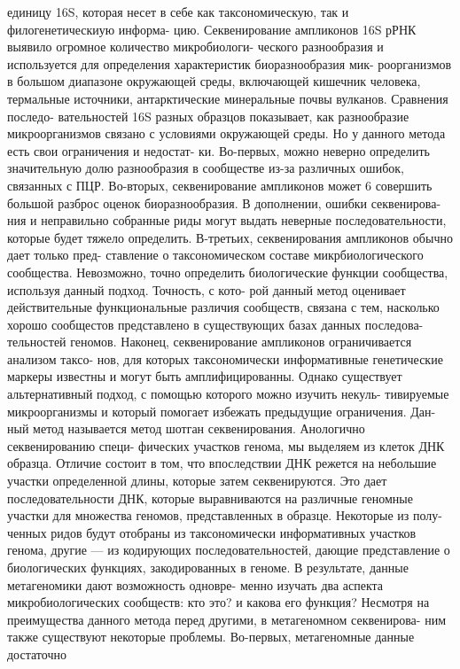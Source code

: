 единицу 16S, которая несет в себе как таксономическую, так и филогенетическиую информа-
цию. Секвенирование ампликонов 16S рРНК выявило огромное количество микробиологи-
ческого разнообразия и используется для определения характеристик биоразнообразия мик-
роорганизмов в большом диапазоне окружающей среды, включающей кишечник человека,
термальные источники, антарктические минеральные почвы вулканов. Сравнения последо-
вательностей 16S разных образцов показывает, как разнообразие микроорганизмов связано
с условиями окружающей среды. Но у данного метода есть свои ограничения и недостат-
ки. Во-первых, можно неверно определить значительную долю разнообразия в сообществе
из-за различных ошибок, связанных с ПЦР. Во-вторых, секвенирование ампликонов может
6
совершить большой разброс оценок биоразнообразия. В дополнении, ошибки секвенирова-
ния и неправильно собранные риды могут выдать неверные последовательности, которые
будет тяжело определить. В-третьих, секвенирования ампликонов обычно дает только пред-
ставление о таксономическом составе микрбиологического сообщества. Невозможно, точно
определить биологические функции сообщества, используя данный подход. Точность, с кото-
рой данный метод оценивает действительные функциональные различия сообществ, связана
с тем, насколько хорошо сообщестов представлено в существующих базах данных последова-
тельностей геномов. Наконец, секвенирование ампликонов ограничивается анализом таксо-
нов, для которых таксономически информативные генетические маркеры известны и могут
быть амплифицированны.
Однако существует альтернативный подход, с помощью которого можно изучить некуль-
тивируемые микроорганизмы и который помогает избежать предыдущие ограничения. Дан-
ный метод называется метод шотган секвенирования. Анологично секвенированию специ-
фических участков генома, мы выделяем из клеток ДНК образца. Отличие состоит в том,
что впоследствии ДНК режется на небольшие участки определенной длины, которые затем
секвенируются. Это дает последовательности ДНК, которые выравниваются на различные
геномные участки для множества геномов, представленных в образце. Некоторые из полу-
ченных ридов будут отобраны из таксономически информативных участков генома, другие
— из кодирующих последовательностей, дающие представление о биологических функциях,
закодированных в геноме. В результате, данные метагеномики дают возможность одновре-
менно изучать два аспекта микробиологических сообществ: кто это? и какова его функция?
Несмотря на преимущества данного метода перед другими, в метагеномном секвенирова-
ним также существуют некоторые проблемы. Во-первых, метагеномные данные достаточно
